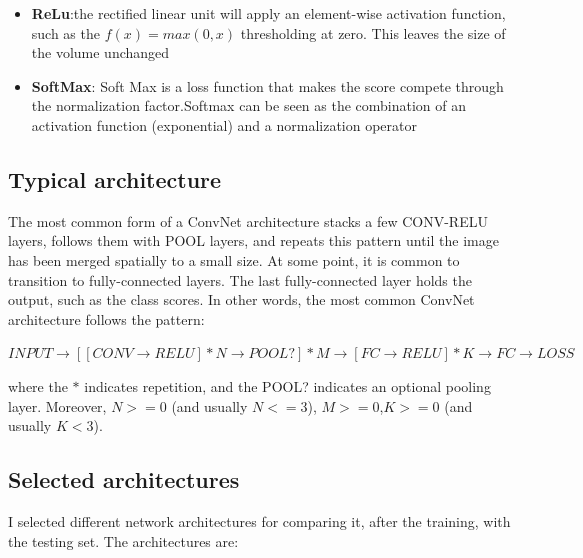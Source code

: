 \documentclass[]{report}
\begin{document}
\begin{itemize}
\item \textbf{ReLu}:the rectified linear unit will apply an element-wise activation function, such as the $ f(x) = max(0,x) $ thresholding at zero. This leaves the size of the volume unchanged 

\item \textbf{SoftMax}: Soft Max is a loss function that makes the score compete through the normalization
factor.Softmax can be seen as the combination of an activation function
(exponential) and a normalization operator

\end{itemize}


\subsection{Typical architecture}

The most common form of a ConvNet architecture stacks a few CONV-RELU layers, follows them with POOL layers, and repeats this pattern until the image has been merged spatially to a small size. At some point, it is common to transition to fully-connected layers. The last fully-connected layer holds the output, such as the class scores. In other words, the most common ConvNet architecture follows the pattern:

$INPUT\rightarrow [[CONV\rightarrow RELU]*N\rightarrow POOL?]*M\rightarrow[FC\rightarrow RELU]*K\rightarrow FC \rightarrow LOSS $

where the $ * $ indicates repetition, and the POOL? indicates an optional pooling layer. Moreover, $ N>=0 $ (and usually $ N<=3 $), $M >= 0$,$ K >= 0$ (and usually $ K < 3$).

\subsection{Selected architectures}

I selected different network architectures for comparing it, after the training, with the testing set. The architectures are:
\end{document}
